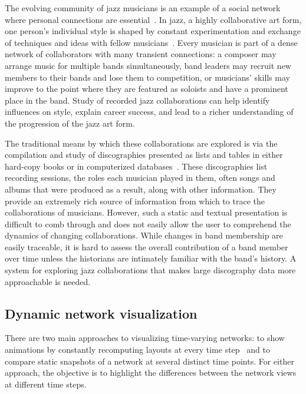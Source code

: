 \documentclass[12pt]{cmuthesis}
\begin{document}
  The evolving community of jazz musicians is an example of a social network where personal connections are essential~\cite{Pinheiro2009}. In jazz, a highly collaborative art form, one person's individual style is shaped by constant experimentation and exchange of techniques and ideas with fellow musicians~\cite{Berliner1994}.  Every musician is part of a dense network of collaborators with many transient connections: a composer may arrange music for multiple bands simultaneously, band leaders may recruit new members to their bands and lose them to competition, or musicians' skills may improve to the point where they are featured as soloists and have a prominent place in the band. Study of recorded jazz collaborations can help identify influences on style, explain career success, and lead to a richer understanding of the progression of the jazz art form.

  The traditional means by which these collaborations are explored is via the compilation and study of discographies presented as lists and tables in either hard-copy books or in computerized databases~\cite{Timner2007,Albin}. These discographies list recording sessions, the roles each musician played in them, often songs and albums that were produced as a result, along with other information. They provide an extremely rich source of information from which to trace the collaborations of musicians. However, such a static and textual presentation is difficult to comb through and does not easily allow the user to comprehend the dynamics of changing collaborations. While changes in band membership are easily traceable, it is hard to assess the overall contribution of a band member over time unless the historians are intimately familiar with the band's history. A system for exploring jazz collaborations that makes large discography data more approachable is needed.

  

  \subsection{Dynamic network visualization}

  There are two main approaches to visualizing time-varying networks: to show animations by constantly recomputing layouts at every time step~\cite{Yee2001} and to compare static snapshots of a network at several distinct time points. For either approach, the objective is to highlight the differences between the network views at different time steps.
\end{document}
